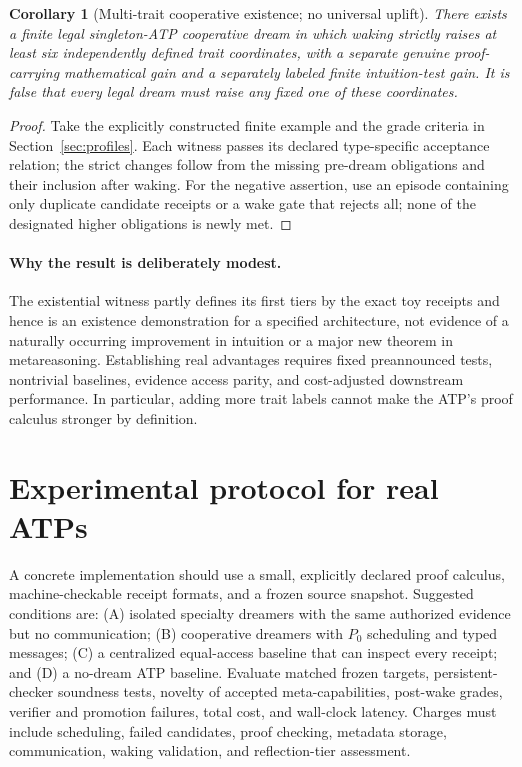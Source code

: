 \documentclass[11pt,letterpaper]{article}
\theoremstyle{definition}
\theoremstyle{plain}
\newtheorem{corollary}[definition]{Corollary}
\theoremstyle{definition}
\begin{document}
\begin{corollary}[Multi-trait cooperative existence; no universal uplift]
There exists a finite legal singleton-ATP cooperative dream in which waking strictly raises at least six independently defined trait coordinates, with a separate genuine proof-carrying mathematical gain and a separately labeled finite intuition-test gain. It is false that every legal dream must raise any fixed one of these coordinates.
\end{corollary}
\begin{proof}
Take the explicitly constructed finite example and the grade criteria in Section~\ref{sec:profiles}. Each witness passes its declared type-specific acceptance relation; the strict changes follow from the missing pre-dream obligations and their inclusion after waking. For the negative assertion, use an episode containing only duplicate candidate receipts or a wake gate that rejects all; none of the designated higher obligations is newly met.
\end{proof}

\paragraph{Why the result is deliberately modest.}
The existential witness partly defines its first tiers by the exact toy receipts and hence is an existence demonstration for a specified architecture, not evidence of a naturally occurring improvement in intuition or a major new theorem in metareasoning. Establishing real advantages requires fixed preannounced tests, nontrivial baselines, evidence access parity, and cost-adjusted downstream performance. In particular, adding more trait labels cannot make the ATP's proof calculus stronger by definition.

\section{Experimental protocol for real ATPs}\label{gl-first-W0-s16}
A concrete implementation should use a small, explicitly declared proof calculus, machine-checkable receipt formats, and a frozen source snapshot. Suggested conditions are: (A) isolated specialty dreamers with the same authorized evidence but no communication; (B) cooperative dreamers with $P_0$ scheduling and typed messages; (C) a centralized equal-access baseline that can inspect every receipt; and (D) a no-dream ATP baseline. Evaluate matched frozen targets, persistent-checker soundness tests, novelty of accepted meta-capabilities, post-wake grades, verifier and promotion failures, total cost, and wall-clock latency. Charges must include scheduling, failed candidates, proof checking, metadata storage, communication, waking validation, and reflection-tier assessment.
\end{document}
